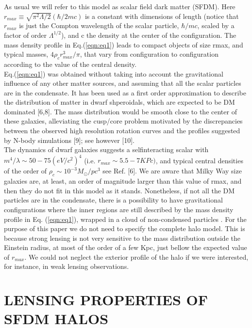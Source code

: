\documentclass[9.5pt, twocolumn]{article}
\begin{document}
As usual we will refer to this model as scalar field dark
matter (SFDM). Here $r_{max}\equiv \sqrt{\pi^2\Lambda/2}(\hbar/2mc)$ is a constant
with dimensions of length (notice that $r_{max}$ is just
the Compton wavelength of the scalar particle, $\hbar/mc$,
scaled by a factor of order $\Lambda^{1/2}$), and c the density at
the center of the configuration. The mass density profile
in Eq.(\ref{eqn:eq1}) leads to compact objects of size rmax, and typical
masses, $4\rho_cr^3_{max}/\pi$, that vary from configuration to
configuration according to the value of the central density.\\ Eq.(\ref{eqn:eq1}) was obtained without taking into account the
gravitational influence of any other matter sources, and
assuming that all the scalar particles are in the condensate.
It has been used as a first order approximation to
describe the distribution of matter in dwarf shperoidals,
which are expected to be DM dominated [6,8]. The mass
distribution would be smooth close to the center of these
galaxies, alleviating the cusp/core problem motivated by
the discrepancies between the observed high resolution
rotation curves and the profiles suggested by N-body simulations
[9]; see however [10].\\
The dynamics of dwarf galaxies suggests a selfinteracting
scalar with $m^4/\lambda\sim 50-75(eV/c^2)^4$ (i.e.
$r_{max} \sim 5.5-7KPc)$, and typical central densities of the
order of $\rho_c\sim 10^{-3}M_{\odot}/pc^3$ see Ref. [6]. We are aware
that Milky Way size galaxies are, at least, an order of
magnitude larger than this value of rmax, and then they
do not fit in this model as it stands. Nonetheless, if
not all the DM particles are in the condensate, there is
a possibility to have gravitational configurations where
the inner regions are still described by the mass density
profile in Eq. (\ref{eqn:eq1}), wrapped in a cloud of non-condensed
particles \cite{Harko_2011}. For the purpose of this paper we do not
need to specify the complete halo model. This is because
strong lensing is not very sensitive to the mass distribution
outside the Einstein radius, at most of the order of
a few Kpc, just bellow the expected value of $r_{max}$. We
could not neglect the exterior profile of the halo if we were
interested, for instance, in weak lensing observations.


\section{\centering LENSING PROPERTIES OF SFDM HALOS}
\end{document}
